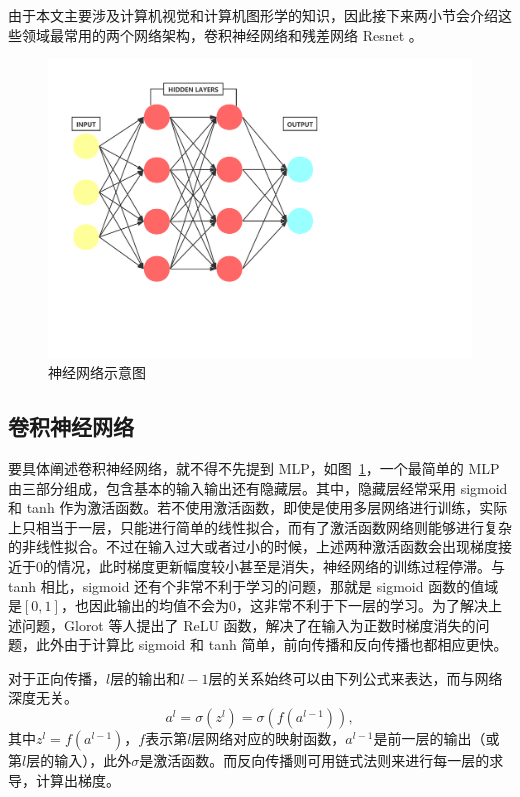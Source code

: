 由于本文主要涉及计算机视觉和计算机图形学的知识，因此接下来两小节会介绍这些领域最常用的两个网络架构，卷积神经网络和残差网络 Resnet 。

\begin{figure}[t]
  \centering
  \includegraphics[width=0.85\linewidth]{figures/fc.pdf}
  \caption{神经网络示意图}
  \label{fig:neuralNetwork}
\end{figure}

\subsection{卷积神经网络}
要具体阐述卷积神经网络，就不得不先提到 MLP，如图~\ref{fig:neuralNetwork}，一个最简单的 MLP 由三部分组成，包含基本的输入输出还有隐藏层。其中，隐藏层经常采用 sigmoid 和 tanh 作为激活函数。若不使用激活函数，即使是使用多层网络进行训练，实际上只相当于一层，只能进行简单的线性拟合，而有了激活函数网络则能够进行复杂的非线性拟合。不过在输入过大或者过小的时候，上述两种激活函数会出现梯度接近于0的情况，此时梯度更新幅度较小甚至是消失，神经网络的训练过程停滞。与 tanh 相比，sigmoid 还有个非常不利于学习的问题，那就是 sigmoid 函数的值域是$[0,1]$，也因此输出的均值不会为0，这非常不利于下一层的学习。为了解决上述问题，Glorot 等人\cite{glorot2011deep}提出了 ReLU 函数，解决了在输入为正数时梯度消失的问题，此外由于计算比 sigmoid 和 tanh 简单，前向传播和反向传播也都相应更快。

对于正向传播，$l$层的输出和$l-1$层的关系始终可以由下列公式来表达，而与网络深度无关。
\begin{equation}
    a^{l} = \sigma(z^{l}) = \sigma(f(a^{l-1})),
\end{equation}
其中$z^l = f(a^{l-1})$，$f$表示第$l$层网络对应的映射函数，$a^{l-1}$是前一层的输出（或第$l$层的输入），此外$\sigma$是激活函数。而反向传播则可用链式法则来进行每一层的求导，计算出梯度。

